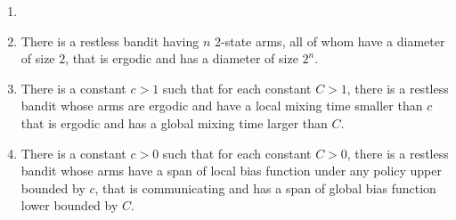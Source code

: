 \begin{thm}
    \label{thm:parameters}
    \begin{enumerate}[label=(\roman*)]
        \item[]
        \item \label{thm:diam} There is a restless bandit having $n$ 2-state arms, all of whom have a diameter of size $2$, that is ergodic and has a diameter of size $2^n$. %
        \item \label{thm:mixing} There is a constant $c>1$ such that for each constant $C>1$, there is a restless bandit whose arms are ergodic and have a local mixing time smaller than $c$ that is ergodic and has a global mixing time larger than $C$.
        \item \label{thm:span} There is a constant $c>0$ such that for each constant $C>0$, there is a restless bandit whose arms have a span of local bias function under any policy upper bounded by $c$, that is communicating and has a span of global bias function lower bounded by $C$.
    \end{enumerate}
\end{thm}
